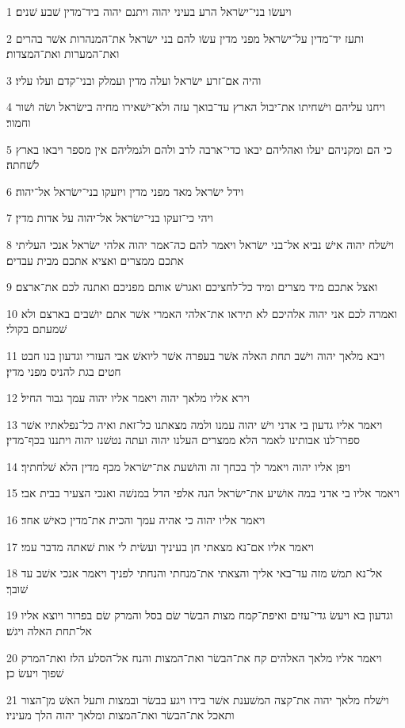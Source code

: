 \par 1 ויעשׂו בני־ישׂראל הרע בעיני יהוה ויתנם יהוה ביד־מדין שׁבע שׁנים׃
\par 2 ותעז יד־מדין על־ישׂראל מפני מדין עשׂו להם בני ישׂראל את־המנהרות אשׁר בהרים ואת־המערות ואת־המצדות׃
\par 3 והיה אם־זרע ישׂראל ועלה מדין ועמלק ובני־קדם ועלו עליו׃
\par 4 ויחנו עליהם וישׁחיתו את־יבול הארץ עד־בואך עזה ולא־ישׁאירו מחיה בישׂראל ושׂה ושׁור וחמור׃
\par 5 כי הם ומקניהם יעלו ואהליהם יבאו כדי־ארבה לרב ולהם ולגמליהם אין מספר ויבאו בארץ לשׁחתה׃
\par 6 וידל ישׂראל מאד מפני מדין ויזעקו בני־ישׂראל אל־יהוה׃
\par 7 ויהי כי־זעקו בני־ישׂראל אל־יהוה על אדות מדין׃
\par 8 וישׁלח יהוה אישׁ נביא אל־בני ישׂראל ויאמר להם כה־אמר יהוה אלהי ישׂראל אנכי העליתי אתכם ממצרים ואציא אתכם מבית עבדים׃
\par 9 ואצל אתכם מיד מצרים ומיד כל־לחציכם ואגרשׁ אותם מפניכם ואתנה לכם את־ארצם׃
\par 10 ואמרה לכם אני יהוה אלהיכם לא תיראו את־אלהי האמרי אשׁר אתם יושׁבים בארצם ולא שׁמעתם בקולי׃
\par 11 ויבא מלאך יהוה וישׁב תחת האלה אשׁר בעפרה אשׁר ליואשׁ אבי העזרי וגדעון בנו חבט חטים בגת להניס מפני מדין׃
\par 12 וירא אליו מלאך יהוה ויאמר אליו יהוה עמך גבור החיל׃
\par 13 ויאמר אליו גדעון בי אדני וישׁ יהוה עמנו ולמה מצאתנו כל־זאת ואיה כל־נפלאתיו אשׁר ספרו־לנו אבותינו לאמר הלא ממצרים העלנו יהוה ועתה נטשׁנו יהוה ויתננו בכף־מדין׃
\par 14 ויפן אליו יהוה ויאמר לך בכחך זה והושׁעת את־ישׂראל מכף מדין הלא שׁלחתיך׃
\par 15 ויאמר אליו בי אדני במה אושׁיע את־ישׂראל הנה אלפי הדל במנשׁה ואנכי הצעיר בבית אבי׃
\par 16 ויאמר אליו יהוה כי אהיה עמך והכית את־מדין כאישׁ אחד׃
\par 17 ויאמר אליו אם־נא מצאתי חן בעיניך ועשׂית לי אות שׁאתה מדבר עמי׃
\par 18 אל־נא תמשׁ מזה עד־באי אליך והצאתי את־מנחתי והנחתי לפניך ויאמר אנכי אשׁב עד שׁובך׃
\par 19 וגדעון בא ויעשׂ גדי־עזים ואיפת־קמח מצות הבשׂר שׂם בסל והמרק שׂם בפרור ויוצא אליו אל־תחת האלה ויגשׁ׃
\par 20 ויאמר אליו מלאך האלהים קח את־הבשׂר ואת־המצות והנח אל־הסלע הלז ואת־המרק שׁפוך ויעשׂ כן׃
\par 21 וישׁלח מלאך יהוה את־קצה המשׁענת אשׁר בידו ויגע בבשׂר ובמצות ותעל האשׁ מן־הצור ותאכל את־הבשׂר ואת־המצות ומלאך יהוה הלך מעיניו׃
